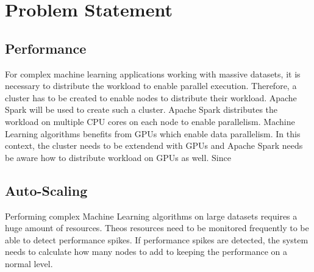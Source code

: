 \section{Problem Statement}
\subsection{Performance}
For complex machine learning applications working with massive datasets, it is necessary to distribute the workload to enable parallel execution. Therefore, a cluster has to be created to enable nodes to distribute their workload. Apache Spark will be used to create such a cluster.
Apache Spark distributes the workload on multiple CPU cores on each node to enable parallelism. Machine Learning algorithms benefits from GPUs which enable data parallelism. In this context, the cluster needs to be extendend with GPUs and Apache Spark needs be aware how to distribute workload on GPUs as well.
Since 


\subsection{Auto-Scaling}
Performing complex Machine Learning algorithms on large datasets requires a huge amount of resources. Theos resources need to be monitored frequently to be able to detect performance spikes. If performance spikes are detected, the system needs to calculate how many nodes to add to keeping the performance on a normal level.








